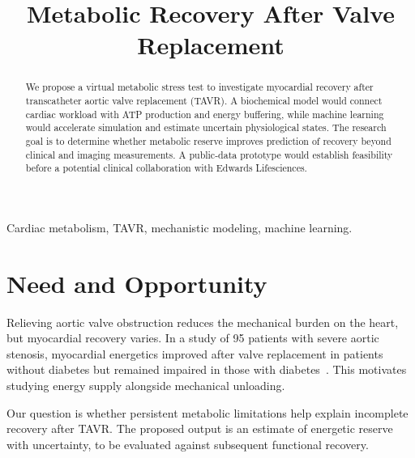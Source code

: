 

\title{Metabolic Recovery After Valve Replacement}
\author{
}
\date{}


\maketitle

\begin{abstract}
We propose a virtual metabolic stress test to investigate myocardial recovery after transcatheter aortic valve replacement (TAVR). A biochemical model would connect cardiac workload with ATP production and energy buffering, while machine learning would accelerate simulation and estimate uncertain physiological states. The research goal is to determine whether metabolic reserve improves prediction of recovery beyond clinical and imaging measurements. A public-data prototype would establish feasibility before a potential clinical collaboration with Edwards Lifesciences.
\end{abstract}

\begin{IEEEkeywords}
Cardiac metabolism, TAVR, mechanistic modeling, machine learning.
\end{IEEEkeywords}

\balance

\section{Need and Opportunity}
Relieving aortic valve obstruction reduces the mechanical burden on the heart, but myocardial recovery varies. In a study of 95 patients with severe aortic stenosis, myocardial energetics improved after valve replacement in patients without diabetes but remained impaired in those with diabetes~\cite{jex2023}. This motivates studying energy supply alongside mechanical unloading.

Our question is whether persistent metabolic limitations help explain incomplete recovery after TAVR. The proposed output is an estimate of energetic reserve with uncertainty, to be evaluated against subsequent functional recovery.


